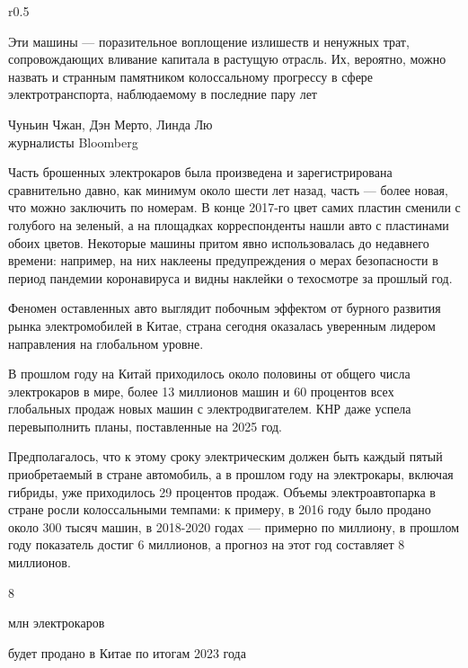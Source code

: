 \begin{wrapfigure}{r}{0.5\textwidth}
    \begin{fancyquotes}
        Эти машины — поразительное воплощение излишеств и ненужных трат, сопровождающих вливание капитала в растущую отрасль. Их, вероятно, можно назвать и странным памятником колоссальному прогрессу в сфере электротранспорта, наблюдаемому в последние пару лет\\

        \begin{flushright}
            Чуньин Чжан, Дэн Мерто, Линда Лю\\
            журналисты Bloomberg
        \end{flushright}
    \end{fancyquotes}
\end{wrapfigure}
Часть брошенных электрокаров была произведена и зарегистрирована сравнительно давно, как минимум около шести лет назад, часть — более новая, что можно заключить по номерам. В конце 2017-го цвет самих пластин сменили с голубого на зеленый, а на площадках корреспонденты нашли авто с пластинами обоих цветов. Некоторые машины притом явно использовалась до недавнего времени: например, на них наклеены предупреждения о мерах безопасности в период пандемии коронавируса и видны наклейки о техосмотре за прошлый год.

Феномен оставленных авто выглядит побочным эффектом от бурного развития рынка электромобилей в Китае, страна сегодня оказалась уверенным лидером направления на глобальном уровне.


В прошлом году на Китай приходилось около половины от общего числа электрокаров в мире, более 13 миллионов машин и 60 процентов всех глобальных продаж новых машин с электродвигателем. КНР даже успела перевыполнить планы, поставленные на 2025 год.

Предполагалось, что к этому сроку электрическим должен быть каждый пятый приобретаемый в стране автомобиль, а в прошлом году на электрокары, включая гибриды, уже приходилось 29 процентов продаж. Объемы электроавтопарка в стране росли колоссальными темпами: к примеру, в 2016 году было продано около 300 тысяч машин, в 2018-2020 годах — примерно по миллиону, в прошлом году показатель достиг 6 миллионов, а прогноз на этот год составляет 8 миллионов.

\vspace*{1em}
\begin{center}
    {\Huge 8}

    {\Large млн электрокаров}

    будет продано в Китае по итогам 2023 года
\end{center}
\vspace*{1em}

